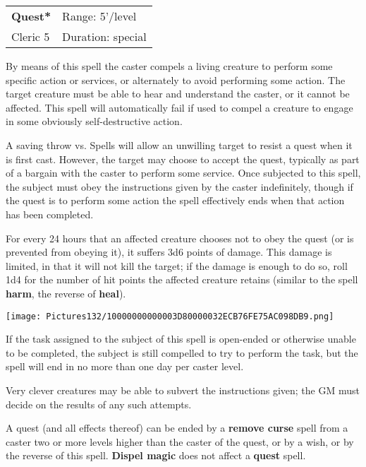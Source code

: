 \documentclass[a4paper,twoside,openany,10pt]{book}
\begin{document}
\begin{multicols}{2}
\smallskip\begin{flushleft} 
	\begin{tabularx}{0.45\textwidth}{@{}m{3.5cm}m{5.5cm}@{}} 
		\textbf{Quest*} & Range: 5'/level\\
Cleric 5 &Duration: special\\
	\end{tabularx}\end{flushleft}

By means of this spell the caster compels a living creature to perform some specific action or services, or alternately to avoid performing some action. The target creature must be able to hear and understand the caster, or it cannot be affected. This spell will automatically fail if used to compel a creature to engage in some obviously self-destructive action.

A saving throw vs. Spells will allow an unwilling target to resist a quest when it is first cast. However, the target may choose to accept the quest, typically as part of a bargain with the caster to perform some service. Once subjected to this spell, the subject must obey the instructions given by the caster indefinitely, though if the quest is to perform some action the spell effectively ends when that action has been completed.

For every 24 hours that an affected creature chooses not to obey the quest (or is prevented from obeying it), it suffers 3d6 points of damage. This damage is limited, in that it will not kill the target; if the damage is enough to do so, roll 1d4 for the number of hit points the affected creature retains (similar to the spell \textbf{harm}, the reverse of \textbf{heal}).


\begin{flushleft}
	\texttt{[image: Pictures132/10000000000003D80000032ECB76FE75AC098DB9.png]}
\end{flushleft}

If the task assigned to the subject of this spell is open-ended or otherwise unable to be completed, the subject is still compelled to try to perform the task, but the spell will end in no more than one day per caster level.

Very clever creatures may be able to subvert the instructions given; the GM must decide on the results of any such attempts.

A quest (and all effects thereof) can be ended by a \textbf{remove curse} spell from a caster two or more levels higher than the caster of the quest, or by a wish, or by the reverse of this spell. \textbf{Dispel magic} does not affect a \textbf{quest }spell.




\end{multicols}
\end{document}
